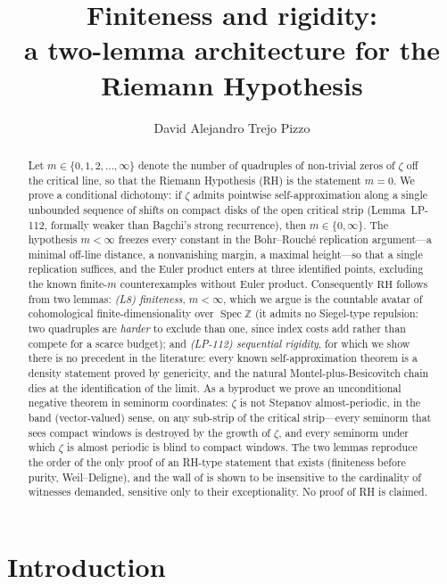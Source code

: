 \documentclass[11pt]{amsart}
\title[Finiteness and Rigidity]{Finiteness and rigidity:\\
a two-lemma architecture for the Riemann Hypothesis}
\author{David Alejandro Trejo Pizzo}
\theoremstyle{definition}
\theoremstyle{remark}
\newcommand{\RH}{\mathrm{RH}}
\newcommand{\bbZ}{\mathbb{Z}}
\DeclareMathOperator{\Spec}{Spec}
\begin{document}
\nocite{bgWeil49,bgDeligne,bgCC21,bgDeninger,bgdeBranges,bgKL,bgBombieri00,bgIK}

\begin{abstract}
Let $m\in\{0,1,2,\dots,\infty\}$ denote the number of quadruples of
non-trivial zeros of $\zeta$ off the critical line, so that the Riemann
Hypothesis (RH) is the statement $m=0$. We prove a conditional dichotomy:
if $\zeta$ admits pointwise self-approximation along a single unbounded
sequence of shifts on compact disks of the open critical strip
(Lemma~LP-112, formally weaker than Bagchi's strong recurrence), then
$m\in\{0,\infty\}$. The hypothesis $m<\infty$ freezes every constant in the
Bohr--Rouch\'e replication argument---a minimal off-line distance, a
nonvanishing margin, a maximal height---so that a single replication
suffices, and the Euler product enters at three identified points,
excluding the known finite-$m$ counterexamples without Euler product.
Consequently $\RH$ follows from two lemmas: \emph{(L8) finiteness},
$m<\infty$, which we argue is the countable avatar of cohomological
finite-dimensionality over $\Spec\bbZ$ (it admits no Siegel-type repulsion:
two quadruples are \emph{harder} to exclude than one, since index costs add
rather than compete for a scarce budget); and \emph{(LP-112) sequential
rigidity}, for which we show there is no precedent in the literature: every
known self-approximation theorem is a density statement proved by
genericity, and the natural Montel-plus-Besicovitch chain dies at the
identification of the limit. As a byproduct we prove an unconditional
negative theorem in seminorm coordinates: $\zeta$ is not Stepanov
almost-periodic, in the band (vector-valued) sense, on any sub-strip of
the critical strip---every seminorm
that sees compact windows is destroyed by the growth of $\zeta$, and every
seminorm under which $\zeta$ is almost periodic is blind to compact
windows. The two lemmas reproduce the order of the only proof of an
RH-type statement that exists (finiteness before purity, Weil--Deligne),
and the wall of \cite{P43} is shown to be insensitive to the cardinality
of witnesses demanded, sensitive only to their exceptionality. No proof of
RH is claimed.
\end{abstract}

\maketitle
\tableofcontents
\newpage

\section{Introduction}
\end{document}
